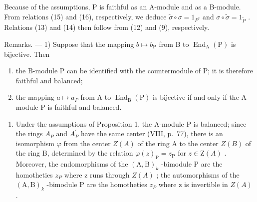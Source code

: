Because of the assumptions, P is faithful as an A-module and as a B-module. From relations (15) and (16), respectively, we deduce \(\widetilde{\sigma} \circ \sigma = 1_{P^{*}}\) and \(\sigma \circ \widetilde{\sigma} = 1_{\widetilde{P}}\) . Relations (13) and (14) then follow from (12) and (9), respectively.

Remarks. --- 1) Suppose that the mapping \(b \mapsto b_{\mathrm{P}}\) from B to \(\operatorname{End}_{\mathrm{A}}(\mathrm{P})\) is bijective. Then

\begin{enumerate}
\def\labelenumi{\alph{enumi})}
\item
  the B-module P can be identified with the countermodule of P; it is therefore faithful and balanced;
\item
  the mapping \(a \mapsto a_{P}\) from A to \(\operatorname{End}_{\mathrm{B}}(\mathrm{P})\) is bijective if and only if the A-module P is faithful and balanced.
\end{enumerate}

\begin{enumerate}
\def\labelenumi{\arabic{enumi})}
\setcounter{enumi}{1}
\tightlist
\item
  Under the assumptions of Proposition 1, the A-module P is balanced; since the rings \(A_{P}\) and \(A_{P}^{\prime}\) have the same center (VIII, p.~77), there is an isomorphism \(\varphi\) from the center \(Z(A)\) of the ring A to the center \(Z(B)\) of the ring B, determined by the relation \(\varphi(z)_{\mathrm{P}} = z_{\mathrm{P}}\) for \(z \in \mathrm{Z}(A)\) . Moreover, the endomorphisms of the \((\mathrm{A}, \mathrm{B})_{k}\) -bimodule P are the homotheties \(z_{P}\) where z runs through \(Z(A)\) ; the automorphisms of the \((\mathrm{A}, \mathrm{B})_{k}\) -bimodule P are the homotheties \(z_{P}\) where z is invertible in \(Z(A)\) .
\end{enumerate}
\relax{}

